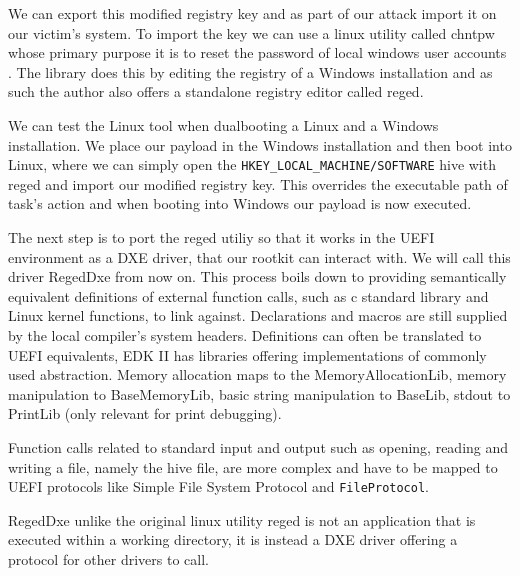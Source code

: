 We can export this modified registry key and as part of our attack import it on our victim's system. To import the key we can use a linux utility called chntpw whose primary purpose it is to reset the password of local windows user accounts \cite{chntpw}. The library does this by editing the registry of a Windows installation and as such the author also offers a standalone registry editor called reged.

We can test the Linux tool when dualbooting a Linux and a Windows installation. We place our payload in the Windows installation and then boot into Linux, where we can simply open the \lstinline{HKEY_LOCAL_MACHINE/SOFTWARE} hive with reged and import our modified registry key.
This overrides the executable path of task's action and when booting into Windows our payload is now executed.


The next step is to port the reged utiliy so that it works in the UEFI environment as a DXE driver, that our rootkit can interact with. We will call this driver RegedDxe from now on.
This process boils down to providing semantically equivalent definitions of external function calls, such as c standard library and Linux kernel functions, to link against. Declarations and macros are still supplied by the local compiler's system headers. Definitions can often be translated to UEFI equivalents, EDK II has libraries offering implementations of commonly used abstraction.
Memory allocation maps to the MemoryAllocationLib, memory manipulation to BaseMemoryLib, basic string manipulation to BaseLib, stdout to PrintLib (only relevant for print debugging).

Function calls related to standard input and output such as opening, reading and writing a file, namely the hive file, are more complex and have to be mapped to UEFI protocols like Simple File System Protocol and \lstinline{FileProtocol}.


RegedDxe unlike the original linux utility reged is not an application that is executed within a working directory, it is instead a DXE driver offering a protocol for other drivers to call.

